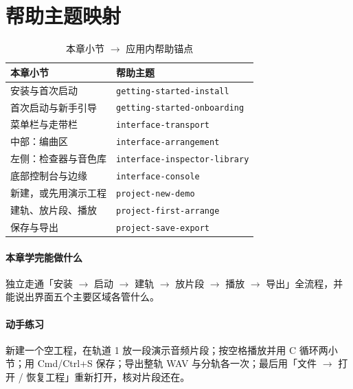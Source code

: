 \section{帮助主题映射}

\begin{table}[htbp]
\centering
\caption{本章小节 $\to$ 应用内帮助锚点}
\label{tab:ch01-help}
\begin{tabular}{ll}
\hline
本章小节 & 帮助主题 \\
\hline
安装与首次启动 & \texttt{getting-started-install} \\
首次启动与新手引导 & \texttt{getting-started-onboarding} \\
菜单栏与走带栏 & \texttt{interface-transport} \\
中部：编曲区 & \texttt{interface-arrangement} \\
左侧：检查器与音色库 & \texttt{interface-inspector-library} \\
底部控制台与边缘 & \texttt{interface-console} \\
新建，或先用演示工程 & \texttt{project-new-demo} \\
建轨、放片段、播放 & \texttt{project-first-arrange} \\
保存与导出 & \texttt{project-save-export} \\
\hline
\end{tabular}
\end{table}

\paragraph{本章学完能做什么} 独立走通「安装 $\to$ 启动 $\to$ 建轨 $\to$ 放片段 $\to$ 播放 $\to$ 导出」全流程，并能说出界面五个主要区域各管什么。

\paragraph{动手练习} 新建一个空工程，在轨道 1 放一段演示音频片段；按空格播放并用 C 循环两小节；用 Cmd/Ctrl+S 保存；导出整轨 WAV 与分轨各一次；最后用「文件 $\to$ 打开 / 恢复工程」重新打开，核对片段还在。
